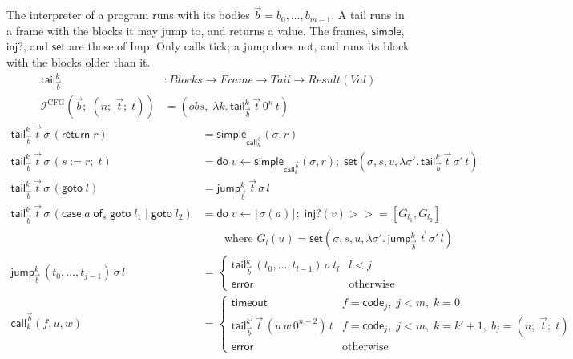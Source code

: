 \documentclass[10pt]{article}
\theoremstyle{acmplain}
\newcommand{\key}[1]{\mathsf{#1}}
\newcommand{\error}{\key{error}}
\newcommand{\obs}{\mathit{obs}}
\newcommand{\codeV}[1]{\key{code}_{#1}}
\newcommand{\assign}[3]{#1 \mathrel{:=} #2;\; #3}
\newcommand{\tmo}{\key{timeout}}
\newcommand{\bind}{\mathbin{>\!\!>\!\!=}}
\newcommand{\Do}{\key{do}\;}
\newcommand{\lift}[1]{\lfloor #1 \rfloor}
\newcommand{\CALL}[2]{\key{call}^{#1}_{#2}}
\newcommand{\Interp}[1]{\mathcal{I}^{#1}}
\begin{document}
The interpreter of a program runs with its bodies $\vec{b} = b_0, \ldots, b_{m-1}$.
A tail runs in a frame with the blocks it may jump to, and returns a
value. The frames, $\key{simple}$, $\key{inj?}$, and $\key{set}$ are
those of Imp. Only calls tick; a jump does not, and runs its block with
the blocks older than it.
\begin{align*}
  \key{tail}^k_{\vec{b}} &: \mathit{Blocks} \to \mathit{Frame} \to \mathit{Tail} \to \mathit{Result}(\mathit{Val}) \\
  \Interp{\mathrm{CFG}}(\vec{b};\; (n;\; \vec{t};\; t)) &= (\obs,\; \lambda k.\, \key{tail}^k_{\vec{b}}\,\vec{t}\,0^n\,t)
\end{align*}
\begin{align*}
  \key{tail}^k_{\vec{b}}\,\vec{t}\,\sigma\,(\key{return}\; r) &= \key{simple}_{\CALL{\vec{b}}{k}}(\sigma, r) \\
  \key{tail}^k_{\vec{b}}\,\vec{t}\,\sigma\,(\assign{s}{r}{t}) &=
    \Do v \leftarrow \key{simple}_{\CALL{\vec{b}}{k}}(\sigma, r);\;
    \key{set}(\sigma, s, v, \lambda \sigma'.\, \key{tail}^k_{\vec{b}}\,\vec{t}\,\sigma'\,t) \\
  \key{tail}^k_{\vec{b}}\,\vec{t}\,\sigma\,(\key{goto}\; l) &= \key{jump}^k_{\vec{b}}\,\vec{t}\,\sigma\,l \\
  \key{tail}^k_{\vec{b}}\,\vec{t}\,\sigma\,(\key{case}\;a\;\key{of}_{s}\;\key{goto}\;l_1 \mid \key{goto}\;l_2) &=
    \Do v \leftarrow \lift{\sigma(a)};\; \key{inj?}(v) \bind [G_{l_1}, G_{l_2}] \\
  &\qquad\text{where } G_l(u) = \key{set}(\sigma, s, u, \lambda \sigma'.\, \key{jump}^k_{\vec{b}}\,\vec{t}\,\sigma'\,l) \\[1ex]
  \key{jump}^k_{\vec{b}}\,(t_0, \ldots, t_{j-1})\,\sigma\,l &=
    \begin{cases}
      \key{tail}^k_{\vec{b}}\,(t_0, \ldots, t_{l-1})\,\sigma\,t_l & l < j \\
      \error & \text{otherwise}
    \end{cases} \\
  \CALL{\vec{b}}{k}(f, u, w) &=
    \begin{cases}
      \tmo & f = \codeV{j},\; j < m,\; k = 0 \\
      \key{tail}^{k'}_{\vec{b}}\,\vec{t}\,(u\, w\, 0^{n-2})\,t
        & f = \codeV{j},\; j < m,\; k = k' + 1,\; b_j = (n;\; \vec{t};\; t) \\
      \error & \text{otherwise}
    \end{cases}
\end{align*}
\end{document}
